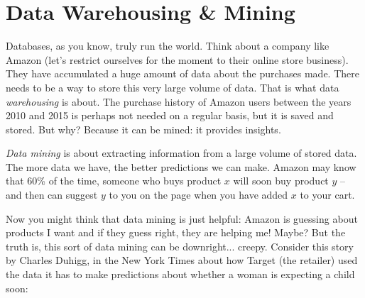 




\section*{Data Warehousing \& Mining}

Databases, as you know, truly run the world. Think about a company like Amazon (let's restrict ourselves for the moment to their online store business). They have accumulated a huge amount of data about the purchases made. There needs to be a way to store this very large volume of data. That is what data \textit{warehousing} is about. The purchase history of Amazon users between the years 2010 and 2015 is perhaps not needed on a regular basis, but it is saved and stored. But why? Because it can be mined: it provides insights.

\textit{Data mining} is about extracting information from a large volume of stored data.  The more data we have, the better predictions we can make. Amazon may know that 60\% of the time, someone who buys product $x$ will soon buy product $y$ -- and then can suggest $y$ to you on the page when you have added $x$ to your cart.

Now you might think that data mining is just helpful: Amazon is guessing about products I want and if they guess right, they are helping me! Maybe? But the truth is, this sort of data mining can be downright... creepy. Consider this story by Charles Duhigg, in the New York Times about how Target (the retailer) used the data it has to make predictions about whether a woman is expecting a child soon: 

